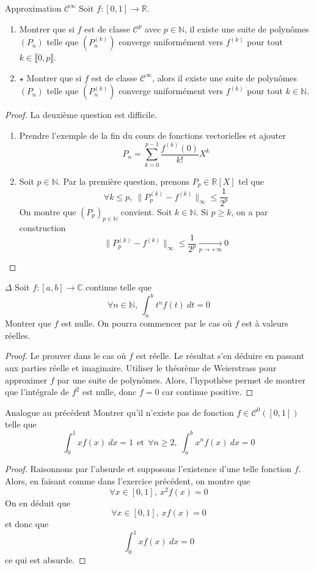 \documentclass[french,a4paper]{article}
\newcommand{\N}{\mathbb{N}}
\newcommand{\R}{\mathbb{R}}
\newcommand{\C}{\mathbb{C}}
\theoremstyle{plain}
\theoremstyle{definition}
\theoremstyle{remark}
\begin{document}
\begin{ex}{Approximation $\mathcal{C}^\infty$}
	Soit $f:[0,1]\to\R$.
	\begin{enumerate}
		\item Montrer que si $f$ est de classe $\mathcal{C}^p$ avec $p\in\N$, il existe une suite de polynômes $(P_n)$ telle que $(P_n^{(k)})$ converge uniformément vers $f^{(k)}$ pour tout $k\in\llbracket0,p\rrbracket$.
		\item $\star$ Montrer que si $f$ est de classe $\mathcal{C}^\infty$, alors il existe une suite de polynômes $(P_n)$ telle que $(P_n^{(k)})$ converge uniformément vers $f^{(k)}$ pour tout $k\in\N$.
	\end{enumerate}
\end{ex}
\begin{proof}
	La deuxième question est difficile.
	\begin{enumerate}
		\item Prendre l'exemple de la fin du cours de fonctions vectorielles et ajouter $$P_n=\sum_{k=0}^{p-1}\frac{f^{(k)}(0)}{k!}X^k$$
		\item Soit $p\in\N$. Par la première question, prenons $P_p\in\R[X]$ tel que $$\forall k\leqslant p,\ \lVert P_p^{(k)}-f^{(k)}\rVert_\infty\leqslant\frac{1}{2^p}$$ On montre que $(P_p)_{p\in\N}$ convient. Soit $k\in\N$. Si $p\geqslant k$, on a par construction $$\lVert P_p^{(k)}-f^{(k)}\rVert_\infty\leqslant\frac{1}{2^p}\xrightarrow[p\to+\infty]{}0$$
	\end{enumerate}
\end{proof}

\begin{ex}{$\Delta$}
	Soit $f:[a,b]\to\C$ continue telle que $$\forall n\in\N,\ \int_{a}^{b}t^nf(t)\ dt=0$$ Montrer que $f$ est nulle. On pourra commencer par le cas où $f$ est à valeurs réelles.
\end{ex}
\begin{proof}
	Le prouver dans le cas où $f$ est réelle. Le résultat s'en déduire en passant aux parties réelle et imaginaire. Utiliser le théorème de Weierstrass pour approximer $f$ par une suite de polynômes. Alors, l'hypothèse permet de montrer que l'intégrale de $f^2$ est nulle, donc $f=0$ car continue positive.
\end{proof}

\begin{ex}{Analogue au précédent}
	Montrer qu'il n'existe pas de fonction $f\in\mathcal{C}^0([0,1])$ telle que $$\int_{0}^{1}xf(x)\ dx=1 \ \ \text{et}\ \ \forall n\geqslant 2,\ \int_{a}^{b}x^nf(x)\ dx=0$$
\end{ex}
\begin{proof}
	Raisonnons par l'absurde et supposons l'existence d'une telle fonction $f$. Alors, en faisant comme dans l'exercice précédent, on montre que $$\forall x\in[0,1],\ x^2f(x)=0$$ On en déduit que $$\forall x\in[0,1],\ xf(x)=0$$ et donc que $$\int_{0}^{1}xf(x)\ dx=0$$ ce qui est absurde.
\end{proof}
\end{document}
